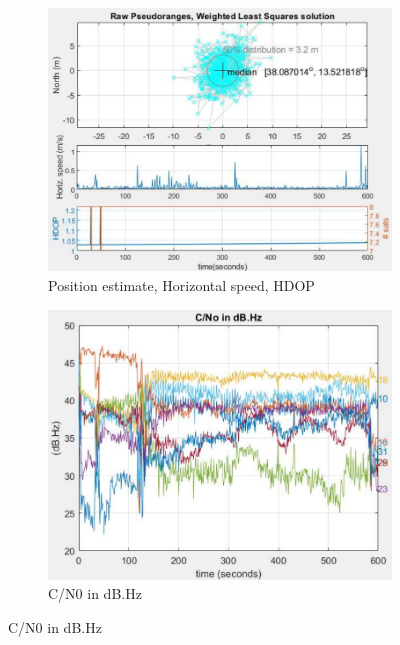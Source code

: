 \begin{figure}[H]
  \begin{subfigure}{.22\textwidth}
  \centering
    \includegraphics[width=1\linewidth]{images/open_sky_fig_4.pdf}
    \caption{Position estimate, Horizontal speed, HDOP}
    \label{fig:open_sky_fig_4}
  \end{subfigure}
  \begin{subfigure}{.22\textwidth}
  \centering
    \includegraphics[width=1\linewidth]{images/open_sky_fig_3.pdf}
    \caption{C/N0 in dB.Hz}
    \label{fig:open_sky_fig_3}
  \end{subfigure}
  \vspace{10pt}
\end{figure}

